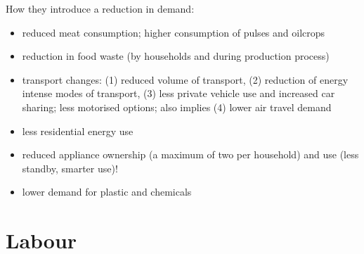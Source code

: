 \begin{itemize}
\begin{itemize}
	How they introduce a reduction in demand: 
	\begin{itemize}
\item reduced meat consumption; higher consumption of pulses and oilcrops
\item reduction in food waste
(by households and during production process)
\item transport changes: (1) reduced volume of transport, (2) reduction of energy intense modes of transport, \ar (3)  less private vehicle use and increased car sharing; less motorised options; also implies \ar (4) lower air travel demand
\item less residential energy use
\item reduced appliance ownership (a maximum of two per household) and use (less standby, smarter use)!
\item lower demand for plastic and chemicals 
	\end{itemize}
\end{itemize}
\end{itemize}

\section{Labour}
